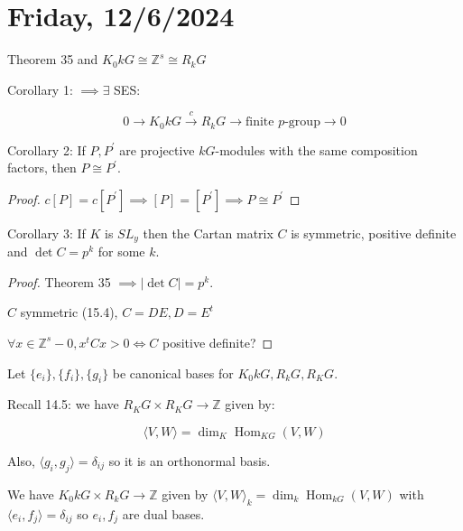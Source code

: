 \documentclass{article}
\theoremstyle{definition}
\begin{document}
\section*{Friday, 12/6/2024}

Theorem 35 and \(K_0 k G \cong \mathbb{Z}^s \cong R_k G\)

Corollary 1: \(\implies \exists\) SES:

\[
    0 \to K_0 k G \overset{c}{\to} R_k G \to \text{finite } p \text{-group} \to 0
\]

Corollary 2: If \(P, P^{\prime}\) are projective \(kG\)-modules with the same composition factors, then \(P \cong P^{\prime}\).

\begin{proof}
    \(c[P]=c[P^{\prime}] \implies [P]=[P^{\prime}]\implies P \cong P^{\prime}\)
\end{proof}

Corollary 3: If \(K\) is \(SL_y\) then the Cartan matrix \(C\) is symmetric, positive definite and \(\det C = p^k\) for some \(k\).

\begin{proof}
    Theorem 35 \(\implies \vert \det C \vert = p^k\).

    \(C\) symmetric (15.4), \(C = D E, D = E^t\) 
    
    \(\forall x \in \mathbb{Z}^s - 0, x^t C x > 0 \iff C\) positive definite?

\end{proof}

Let \(\{ e_i \}, \{ f_i \}, \{ g_i \} \) be canonical bases for \(K_0 k G, R_k G, R_K G\).

Recall 14.5: we have \(R_K G \times R_K G \to \mathbb{Z}\) given by:

\[
    \langle V, W \rangle = \dim_K \operatorname{Hom}_{KG} (V,W)
\]

Also, \(\langle g_i, g_j \rangle = \delta_{ij}\) so it is an orthonormal basis.

We have \(K_0 k G \times R_k G \to \mathbb{Z}\) given by \(\langle V, W \rangle_k = \dim_k \operatorname{Hom}_{kG} (V,W)\) with \(\langle e_i, f_j \rangle = \delta_{ij}\) so \(e_i, f_j\) are dual bases.

\begin{center}
\end{center} 
\end{document}
